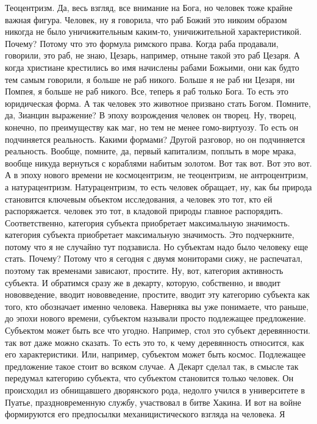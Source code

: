 Теоцентризм. Да, весь взгляд, все внимание на Бога, но человек тоже крайне
важная фигура. Человек, ну я говорила, что раб Божий это никоим образом никогда
не было уничижительным каким-то, уничижительной характеристикой. Почему? Потому
что это формула римского права. Когда раба продавали, говорили, это раб, не
знаю, Цезарь, например, отныне такой это раб Цезаря. А когда христиане
крестились во имя начислены рабами Божьими, они как будто тем самым говорили, я
больше не раб никого. Больше я не раб ни Цезаря, ни Помпея, я больше не раб
никого. Все, теперь я раб только Бога. То есть это юридическая форма. А так
человек это животное призвано стать Богом. Помните, да, Зианцин выражение? В
эпоху возрождения человек он творец. Ну, творец, конечно, по преимуществу как
маг, но тем не менее гомо-виртуозу. То есть он подчиняется реальность. Какими
формами? Другой разговор, но он подчиняется реальность. Вообще, помните, да,
первый капитализм, поплыть в море мрака, вообще никуда вернуться с кораблями
набитым золотом. Вот так вот. Вот это вот. А в эпоху нового времени не
космоцентризм, не теоцентризм, не антроцентризм, а натурацентризм.
Натурацентризм, то есть человек обращает, ну, как бы природа становится ключевым
объектом исследования, а человек это тот, кто ей распоряжается. человек это тот,
в кладовой природы главное распорядить. Соответственно, категория субъекта
приобретает максимальную значимость. категория субъекта приобретает максимальную
значимость. Это подчеркните, потому что я не случайно тут подзависла. Но
субъектам надо было человеку еще стать. Почему? Потому что я сегодня с двумя
мониторами сижу, не распечатал, поэтому так временами зависают, простите. Ну,
вот, категория активность субъекта. И обратимся сразу же в декарту, которую,
собственно, и вводит нововведение, вводит нововведение, простите, вводит эту
категорию субъекта как того, кто обозначает именно человека. Наверняка вы уже
понимаете, что раньше, до эпохи нового времени, субъектом называли просто
подлежащее предложение. Субъектом может быть все что угодно. Например, стол это
субъект деревянности. так вот даже можно сказать. То есть это то, к чему
деревянность относится, как его характеристики. Или, например, субъектом может
быть космос. Подлежащее предложение такое стоит во всяком случае. А Декарт
сделал так, в смысле так передумал категорию субъекта, что субъектом становится
только человек. Он происходил из обнищавшего дворянского рода, недолго учился в
университете в Пуатье, праздновременную службу, участвовал в битве Хакина. И вот
на войне формируются его предпосылки механицистического взгляда на человека. Я
